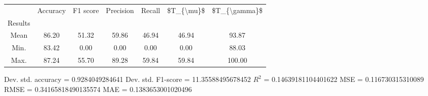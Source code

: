 \begin{tabular}{|c|c|c|c|c|c|c|}
\toprule
{} &  Accuracy &  F1 score &  Precision &  Recall &  \$T\_\{\textbackslash mu\}\$ &  \$T\_\{\textbackslash gamma\}\$ \\
Results &           &           &            &         &            &               \\
\hline
Mean    &     86.20 &     51.32 &      59.86 &   46.94 &      46.94 &         93.87 \\
Min.    &     83.42 &      0.00 &       0.00 &    0.00 &       0.00 &         88.03 \\
Max.    &     87.24 &     55.70 &      89.28 &   59.84 &      59.84 &        100.00 \\
\bottomrule
\end{tabular}

 Dev. std. accuracy = 0.9284049284641
 Dev. std. F1-score = 11.35588495678452
 $R^2$ = 0.14639181104401622
 MSE = 0.116730315310089
 RMSE = 0.34165818490135574
 MAE = 0.1383653001020496